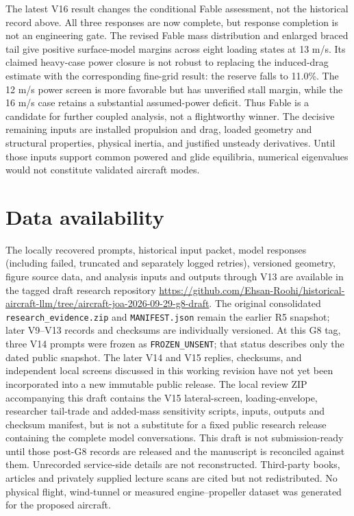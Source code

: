 \documentclass[10pt,letterpaper]{article}
\begin{document}
The latest V16 result changes the conditional Fable assessment, not the historical
record above. All three responses are now complete, but response completion is not
an engineering gate. The revised Fable mass distribution and enlarged braced tail
give positive surface-model margins across eight loading states at 13 m/s. Its
claimed heavy-case power closure is not robust to replacing the induced-drag
estimate with the corresponding fine-grid result: the reserve falls to 11.0\%.
The 12 m/s power screen is more favorable but has unverified stall margin, while
the 16 m/s case retains a substantial assumed-power deficit. Thus Fable is a
candidate for further coupled analysis, not a flightworthy winner. The decisive
remaining inputs are installed propulsion and drag, loaded geometry and structural
properties, physical inertia, and justified unsteady derivatives. Until those
inputs support common powered and glide equilibria, numerical eigenvalues would
not constitute validated aircraft modes.

\section*{Data availability}
The locally recovered prompts, historical input packet, model responses (including failed, truncated and separately logged retries), versioned geometry, figure source data, and analysis inputs and outputs through V13 are available in the tagged draft research repository \url{https://github.com/Ehsan-Roohi/historical-aircraft-llm/tree/aircraft-joa-2026-09-29-g8-draft}. The original consolidated \texttt{research\_evidence.zip} and \texttt{MANIFEST.json} remain the earlier R5 snapshot; later V9--V13 records and checksums are individually versioned. At this G8 tag, three V14 prompts were frozen as \texttt{FROZEN\_UNSENT}; that status describes only the dated public snapshot. The later V14 and V15 replies, checksums, and independent local screens discussed in this working revision have not yet been incorporated into a new immutable public release. The local review ZIP accompanying this draft contains the V15 lateral-screen, loading-envelope, researcher tail-trade and added-mass sensitivity scripts, inputs, outputs and checksum manifest, but is not a substitute for a fixed public research release containing the complete model conversations. This draft is not submission-ready until those post-G8 records are released and the manuscript is reconciled against them. Unrecorded service-side details are not reconstructed. Third-party books, articles and privately supplied lecture scans are cited but not redistributed. No physical flight, wind-tunnel or measured engine--propeller dataset was generated for the proposed aircraft.
\end{document}
